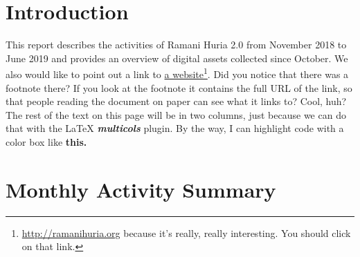 \documentclass[a4paper,12pt,twoside]{article}
\begin{document}

\newpage
\section{Introduction}
\label{Introduction}

This report describes the activities of Ramani Huria 2.0 from November 2018 to June 2019 and provides an overview of digital assets collected since October.
\bigskip
We also would like to point out a link to  \href{https://ramanihuria.org}{a website}\footnote{\url{http://ramanihuria.org}\color{RHgrey} { }because it's really, really interesting. You should click on that link.}. Did you notice that there was a footnote there? If you look at the footnote it contains the full URL of the link, so that people reading the document on paper can see what it links to? Cool, huh? The rest of the text on this page will be in two columns, just because we can do that with the \LaTeX{} \textbf{\textit{multicols}} plugin. By the way, I can highlight code with a color box like \textbf{\colorbox{code}{this.}}

\newpage
\section{Monthly Activity Summary}
\end{document}
